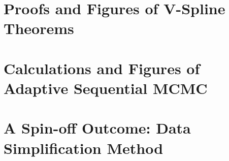 \documentclass[12pt,twoside]{report}
\begin{document}


\begin{appendices}
\makeatletter
{}
\makeatother
 \chapter{Proofs and Figures of V-Spline Theorems}\label{appendTS}

 \chapter{Calculations and Figures of Adaptive Sequential MCMC}\label{appendMCMC}
  
 \chapter{A Spin-off Outcome: Data Simplification Method}\label{appendSimp}
  
\end{appendices}



\clearemptydoublepage
\end{document}
